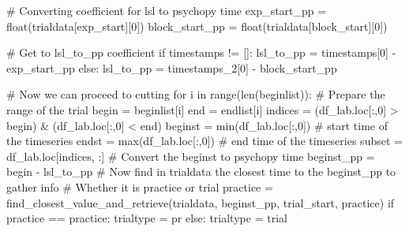 \documentclass[
  letterpaper,
  DIV=11,
  numbers=noendperiod]{scrreprt}
\newenvironment{Shaded}{\begin{snugshade}}{\end{snugshade}}
\newcommand{\BuiltInTok}[1]{\textcolor[rgb]{0.00,0.23,0.31}{#1}}
\newcommand{\CommentTok}[1]{\textcolor[rgb]{0.37,0.37,0.37}{#1}}
\newcommand{\ControlFlowTok}[1]{\textcolor[rgb]{0.00,0.23,0.31}{#1}}
\newcommand{\DecValTok}[1]{\textcolor[rgb]{0.68,0.00,0.00}{#1}}
\newcommand{\KeywordTok}[1]{\textcolor[rgb]{0.00,0.23,0.31}{#1}}
\newcommand{\NormalTok}[1]{\textcolor[rgb]{0.00,0.23,0.31}{#1}}
\newcommand{\OperatorTok}[1]{\textcolor[rgb]{0.37,0.37,0.37}{#1}}
\newcommand{\StringTok}[1]{\textcolor[rgb]{0.13,0.47,0.30}{#1}}
\begin{document}
\begin{Shaded}
\begin{Highlighting}[]
            \CommentTok{\# Converting coefficient for lsl to psychopy time}
\NormalTok{            exp\_start\_pp }\OperatorTok{=} \BuiltInTok{float}\NormalTok{(trialdata[}\StringTok{\textquotesingle{}exp\_start\textquotesingle{}}\NormalTok{][}\DecValTok{0}\NormalTok{])}
\NormalTok{            block\_start\_pp }\OperatorTok{=} \BuiltInTok{float}\NormalTok{(trialdata[}\StringTok{\textquotesingle{}block\_start\textquotesingle{}}\NormalTok{][}\DecValTok{0}\NormalTok{])}
            
            \CommentTok{\# Get to lsl\_to\_pp coefficient}
            \ControlFlowTok{if}\NormalTok{ timestamps }\OperatorTok{!=}\NormalTok{ []:}
\NormalTok{                lsl\_to\_pp }\OperatorTok{=}\NormalTok{ timestamps[}\DecValTok{0}\NormalTok{] }\OperatorTok{{-}}\NormalTok{ exp\_start\_pp}
            \ControlFlowTok{else}\NormalTok{:}
\NormalTok{                lsl\_to\_pp }\OperatorTok{=}\NormalTok{ timestamps\_2[}\DecValTok{0}\NormalTok{] }\OperatorTok{{-}}\NormalTok{ block\_start\_pp}
        
            \CommentTok{\# Now we can proceed to cutting   }
            \ControlFlowTok{for}\NormalTok{ i }\KeywordTok{in} \BuiltInTok{range}\NormalTok{(}\BuiltInTok{len}\NormalTok{(beginlist)):}
                \CommentTok{\# Prepare the range of the trial}
\NormalTok{                begin }\OperatorTok{=}\NormalTok{ beginlist[i]}
\NormalTok{                end }\OperatorTok{=}\NormalTok{ endlist[i]}
\NormalTok{                indices }\OperatorTok{=}\NormalTok{ (df\_lab.loc[:,}\DecValTok{0}\NormalTok{] }\OperatorTok{\textgreater{}}\NormalTok{ begin) }\OperatorTok{\&}\NormalTok{ (df\_lab.loc[:,}\DecValTok{0}\NormalTok{] }\OperatorTok{\textless{}}\NormalTok{ end)}
\NormalTok{                beginst }\OperatorTok{=} \BuiltInTok{min}\NormalTok{(df\_lab.loc[:,}\DecValTok{0}\NormalTok{]) }\CommentTok{\# start time of the timeseries}
\NormalTok{                endst }\OperatorTok{=} \BuiltInTok{max}\NormalTok{(df\_lab.loc[:,}\DecValTok{0}\NormalTok{])  }\CommentTok{\# end time of the timeseries}
\NormalTok{                subset }\OperatorTok{=}\NormalTok{ df\_lab.loc[indices, :]}
                \CommentTok{\# Convert the beginst to psychopy time}
\NormalTok{                beginst\_pp }\OperatorTok{=}\NormalTok{ begin }\OperatorTok{{-}}\NormalTok{ lsl\_to\_pp}
                \CommentTok{\# Now find in trialdata the closest time to the beginst\_pp to gather info}
                \CommentTok{\# Whether it is practice or trial}
\NormalTok{                practice }\OperatorTok{=}\NormalTok{ find\_closest\_value\_and\_retrieve(trialdata, beginst\_pp, }\StringTok{\textquotesingle{}trial\_start\textquotesingle{}}\NormalTok{, }\StringTok{\textquotesingle{}practice\textquotesingle{}}\NormalTok{)}
                \ControlFlowTok{if}\NormalTok{ practice }\OperatorTok{==} \StringTok{\textquotesingle{}practice\textquotesingle{}}\NormalTok{:}
\NormalTok{                    trialtype }\OperatorTok{=} \StringTok{\textquotesingle{}pr\textquotesingle{}}
                \ControlFlowTok{else}\NormalTok{:}
\NormalTok{                    trialtype }\OperatorTok{=} \StringTok{\textquotesingle{}trial\textquotesingle{}}
                

\end{Highlighting}
\end{Shaded}
\end{document}
